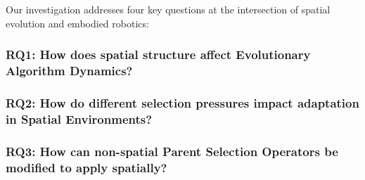 \documentclass[dvipsnames,format=sigconf,anonymous=false,review=false]{acmart}
\begin{document}
Our investigation addresses four key questions at the intersection of spatial evolution and embodied robotics:

\subsubsection*{RQ1: How does spatial structure affect Evolutionary Algorithm Dynamics?}


\subsubsection*{RQ2: How do different selection pressures impact adaptation in Spatial Environments?}


\subsubsection*{RQ3: How can non-spatial Parent Selection Operators be modified to apply spatially?}

\end{document}
